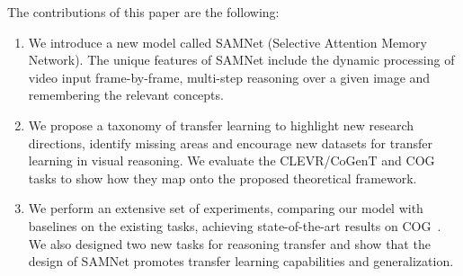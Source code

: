 \noindent The contributions of this paper are the following:
\begin{enumerate}
	\item We introduce a new model called SAMNet (Selective Attention Memory Network).
	The unique features of SAMNet include the dynamic processing of video input frame-by-frame, multi-step reasoning over a given image and remembering the relevant concepts.
	\item We propose a taxonomy of transfer learning to highlight new research directions, identify missing areas and encourage new datasets for transfer learning in visual reasoning. We evaluate the CLEVR/CoGenT and COG tasks to show how they map onto the proposed theoretical framework.
	\item We perform an extensive set of experiments, comparing our model with baselines on the existing tasks, achieving state-of-the-art results on COG~\cite{yang2018dataset}. We also designed two new tasks for reasoning transfer and show that the design of SAMNet promotes transfer learning capabilities and generalization.

\end{enumerate}
